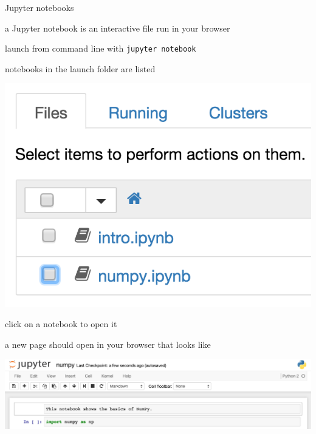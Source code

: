 \documentclass[10pt,mathserif]{beamer}
\begin{document}
\begin{frame}[fragile]{Jupyter notebooks}
\BIT
\item a Jupyter notebook is an interactive file run in your browser
\item launch from command line with \texttt{jupyter notebook}
\item notebooks in the launch folder are listed
\begin{center}
  \includegraphics[height=0.20\textheight]{images/jupyter_load.png}
\end{center}
\item click on a notebook to open it
\item a new page should open in your browser that looks like
  \begin{center}
    \includegraphics[height=0.15\textheight]{images/jupyter_example_notebook.png}
  \end{center}
\EIT
\end{frame}

\end{document}
